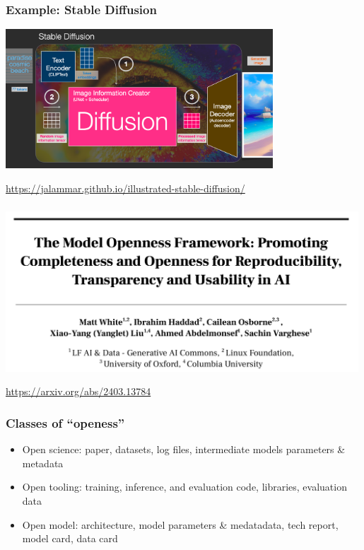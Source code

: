 \documentclass[17pt,aspectratio=169,hyperref={pdfusetitle,colorlinks,allcolors=olive}]{beamer}
\begin{document}
\begin{frame}[fragile]
  \frametitle{Example: Stable Diffusion}

      \includegraphics[width=10cm]{figs/sd-process}

  \begin{flushright}
    {\scriptsize
    \url{https://jalammar.github.io/illustrated-stable-diffusion/}
    }
  \end{flushright}

\end{frame}



\begin{frame}[fragile]
\frametitle{}

  \includegraphics[height=6cm]{figs/paper-openess-framework}

  \begin{flushright}
    {\small
      \url{https://arxiv.org/abs/2403.13784}
    }
  \end{flushright} 

\end{frame}

\begin{frame}[fragile]
\frametitle{Classes of ``openess''}

\begin{itemize}
\item Open science: paper, datasets, log files, intermediate models parameters \& metadata
\item Open tooling: training, inference, and evaluation code, libraries, evaluation data
\item Open model: architecture, model parameters \& medatadata, tech report, model card, data card
\end{itemize}

\end{frame}
\end{document}
